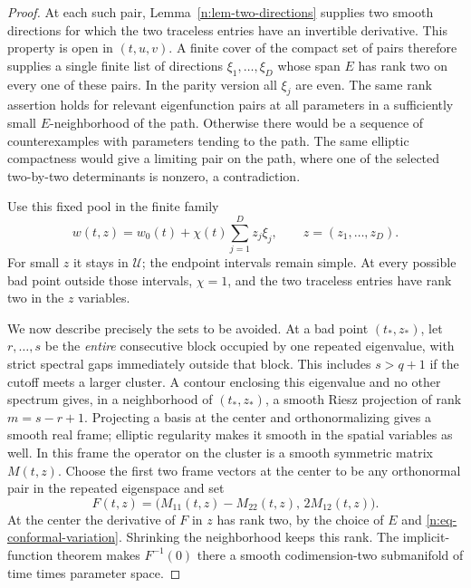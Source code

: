 \begin{proof}
At each such pair, Lemma~\ref{n:lem-two-directions} supplies two smooth
directions for which the two traceless entries have an invertible
derivative.  This property is open in \((t,u,v)\).  A finite cover of
the compact set of pairs therefore supplies a single finite list of
directions \(\xi_1,\ldots,\xi_D\) whose span \(E\) has rank two on
every one of these pairs.  In the parity version all \(\xi_j\) are
even.  The same rank assertion holds for relevant eigenfunction pairs
at all parameters in a sufficiently small \(E\)-neighborhood of the
path.  Otherwise there would be a sequence of counterexamples with
parameters tending to the path.  The same elliptic compactness would
give a limiting pair on the path, where one of the selected two-by-two
determinants is nonzero, a contradiction.

Use this fixed pool in the finite family
\begin{equation}\label{n:eq-path-perturbation}
 w(t,z)=w_0(t)+\chi(t)\sum_{j=1}^D z_j\xi_j,
 \qquad z=(z_1,\ldots,z_D).
\end{equation}
For small \(z\) it stays in \(\mathcal U\); the endpoint intervals
remain simple.  At every possible bad point outside those intervals,
\(\chi=1\), and the two traceless entries have rank two in the
\(z\) variables.

We now describe precisely the sets to be avoided.  At a bad point
\((t_*,z_*)\), let \(r,\ldots,s\) be the \emph{entire} consecutive
block occupied by one repeated eigenvalue, with strict spectral gaps
immediately outside that block.  This includes \(s>q+1\) if the
cutoff meets a larger cluster.  A contour enclosing this eigenvalue
and no other spectrum gives, in a neighborhood of \((t_*,z_*)\), a
smooth Riesz projection of rank \(m=s-r+1\).  Projecting a basis at
the center and orthonormalizing gives a smooth real frame; elliptic
regularity makes it smooth in the spatial variables as well.  In this
frame the operator on the cluster is a smooth symmetric matrix
\(M(t,z)\).  Choose the first two frame vectors at the center to be
any orthonormal pair in the repeated eigenspace and set
\begin{equation}\label{n:eq-chart-equations}
 F(t,z)=\bigl(M_{11}(t,z)-M_{22}(t,z),\,2M_{12}(t,z)\bigr).
\end{equation}
At the center the derivative of \(F\) in \(z\) has rank two, by the
choice of \(E\) and \eqref{n:eq-conformal-variation}.  Shrinking the
neighborhood keeps this rank.  The implicit-function theorem makes
\(F^{-1}(0)\) there a smooth codimension-two submanifold of time
times parameter space.


\end{proof}
